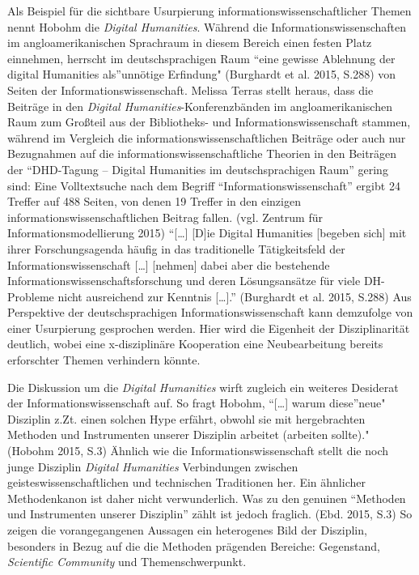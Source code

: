 \documentclass[a4paper,
fontsize=11pt,
oneside,
numbers=noperiodatend,
parskip=half-,
bibliography=totoc,
final
]{scrartcl}
\begin{document}
Als Beispiel für die sichtbare Usurpierung
informationswissenschaftlicher Themen nennt Hobohm die \emph{Digital
Humanities}. Während die Informationswissenschaften im
angloamerikanischen Sprachraum in diesem Bereich einen festen Platz
einnehmen, herrscht im deutschsprachigen Raum \enquote{eine gewisse
Ablehnung der digital Humanities als}unnötige Erfindung" (Burghardt et
al. 2015, S.288) von Seiten der Informationswissenschaft. Melissa Terras
stellt heraus, dass die Beiträge in den \emph{Digital
Humanities}-Konferenzbänden im angloamerikanischen Raum zum Großteil aus
der Bibliotheks- und Informationswissenschaft stammen, während im
Vergleich die informationswissenschaftlichen Beiträge oder auch nur
Bezugnahmen auf die informationswissenschaftliche Theorien in den
Beiträgen der \enquote{DHD-Tagung -- Digital Humanities im
deutschsprachigen Raum} gering sind: Eine Volltextsuche nach dem Begriff
\enquote{Informationswissenschaft} ergibt 24 Treffer auf 488 Seiten, von
denen 19 Treffer in den einzigen informationswissenschaftlichen Beitrag
fallen. (vgl. Zentrum für Informationsmodellierung 2015)
\enquote{{[}\ldots{}{]} {[}D{]}ie Digital Humanities {[}begeben sich{]}
mit ihrer Forschungsagenda häufig in das traditionelle Tätigkeitsfeld
der Informationswissenschaft {[}\ldots{}{]} {[}nehmen{]} dabei aber die
bestehende Informationswissenschaftsforschung und deren Lösungsansätze
für viele DH-Probleme nicht ausreichend zur Kenntnis {[}\ldots{}{]}.}
(Burghardt et al. 2015, S.288) Aus Perspektive der deutschsprachigen
Informationswissenschaft kann demzufolge von einer Usurpierung
gesprochen werden. Hier wird die Eigenheit der Disziplinarität deutlich,
wobei eine x-disziplinäre Kooperation eine Neubearbeitung bereits
erforschter Themen verhindern könnte.

Die Diskussion um die \emph{Digital Humanities} wirft zugleich ein
weiteres Desiderat der Informationswissenschaft auf. So fragt Hobohm,
\enquote{{[}\ldots{}{]} warum diese}neue" Disziplin z.Zt. einen solchen
Hype erfährt, obwohl sie mit hergebrachten Methoden und Instrumenten
unserer Disziplin arbeitet (arbeiten sollte)." (Hobohm 2015, S.3)
Ähnlich wie die Informationswissenschaft stellt die noch junge Disziplin
\emph{Digital Humanities} Verbindungen zwischen
geisteswissenschaftlichen und technischen Traditionen her. Ein ähnlicher
Methodenkanon ist daher nicht verwunderlich. Was zu den genuinen
\enquote{Methoden und Instrumenten unserer Disziplin} zählt ist jedoch
fraglich. (Ebd. 2015, S.3) So zeigen die vorangegangenen Aussagen ein
heterogenes Bild der Disziplin, besonders in Bezug auf die die Methoden
prägenden Bereiche: Gegenstand, \emph{Scientific Community} und
Themenschwerpunkt.
\end{document}
